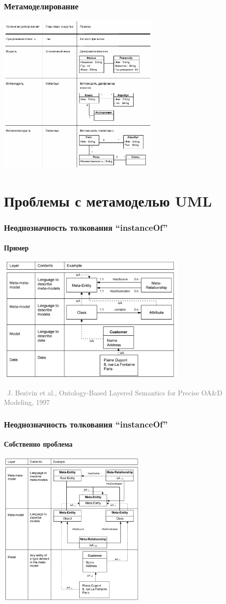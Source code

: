 \documentclass[xetex,mathserif,serif]{beamer}
\newcommand{\attribution}[1] {
\vspace{-5mm}\begin{flushright}\begin{scriptsize}\textcolor{gray}{\textcopyright\, #1}\end{scriptsize}\end{flushright}
}
\begin{document}
	\begin{frame}
		\frametitle{Метамоделирование}
		\begin{center}
			\includegraphics[width=0.6\textwidth]{metalevels.png}
		\end{center}
	\end{frame}

	\section{Проблемы с метамоделью UML}

	\begin{frame}
		\frametitle{Неоднозначность толкования ``instanceOf''}
		\framesubtitle{Пример}
		\begin{center}
			\includegraphics[width=0.7\textwidth]{bezivinExample.png}
			\attribution{J. Bezivin et al., Ontology-Based Layered Semantics for Precise OA\&D Modeling, 1997}
		\end{center}
	\end{frame}

	\begin{frame}
		\frametitle{Неоднозначность толкования ``instanceOf''}
		\framesubtitle{Собственно проблема}
		\begin{center}
			\includegraphics[width=0.55\textwidth]{bezivinIsA.png}
		\end{center}
	\end{frame}
\end{document}
